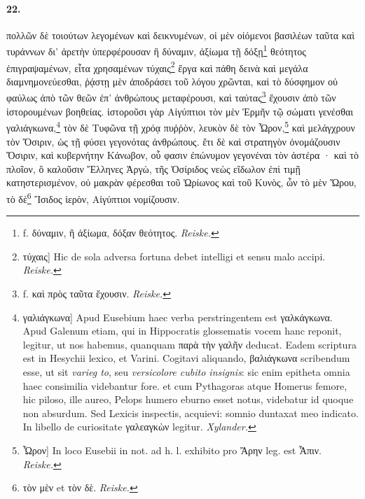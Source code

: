 \documentclass[a4paper, 11pt, oneside, polutonikogreek, german]{article}
\begin{document}
\paragraph{22.}
πολλῶν δὲ τοιούτων λεγομένων καὶ δεικνυμένων, οἱ μὲν οἰόμενοι βασιλέων ταῦτα καὶ τυράννων δι' ἀρετὴν ὑπερφέρουσαν ἢ δύναμιν, ἀξίωμα τῇ δόξῃ\footnote{f. δύναμιν, ἢ ἀξίωμα, δόξαν θεότητος. \emph{Reiske.}} θεότητος ἐπιγραψαμένων, εἶτα χρησαμένων τύχαις\footnote{τύχαις] Hic de sola adversa fortuna debet intelligi et sensu malo accipi. \emph{Reiske.}} ἔργα καὶ πάθη δεινὰ καὶ μεγάλα διαμνημονεύεσθαι, ῥᾴστῃ μὲν ἀποδράσει τοῦ λόγου χρῶνται, καὶ τὸ δύσφημον οὐ φαύλως ἀπὸ τῶν θεῶν ἐπ' ἀνθρώπους μεταφέρουσι, καὶ ταύτας\footnote{f. καὶ πρὸς ταῦτα ἔχουσιν. \emph{Reiske.}} ἔχουσιν ἀπὸ τῶν ἱστορουμένων βοηθείας. ἱστοροῦσι γὰρ Αἰγύπτιοι τὸν μὲν Ἑρμῆν τῷ σώματι γενέσθαι γαλιάγκωνα,\footnote{γαλιάγκωνα] Apud Eusebium haec verba perstringentem est γαλκάγκωνα. Apud Galenum etiam, qui in Hippocratis glossematis vocem hanc reponit, legitur, ut nos habemus, quanquam παρὰ τὴν γαλῆν deducat. Eadem scriptura est in Hesychii lexico, et Varini. Cogitavi aliquando, βαλιάγκωνα scribendum esse, ut sit \emph{varieg to}, seu \emph{versicolore cubito insignis}: sic enim epitheta omnia haec consimilia videbantur fore. et cum Pythagoras atque Homerus femore, hic piloso, ille aureo, Pelops humero eburno esset notus, videbatur id quoque non absurdum. Sed Lexicis inspectis, acquievi: somnio duntaxat meo indicato. In libello de curiositate γαλεαγκὼν legitur. \emph{Xylander.}} τὸν δὲ Τυφῶνα τῇ χρόᾳ πυῤῥὸν, λευκὸν δὲ τὸν Ὦρον,\footnote{Ὦρον] In loco Eusebii in not. ad h. l. exhibito pro Ἄρην leg. est Ἆπιν. \emph{Reiske.}} καὶ μελάγχρουν τὸν Ὄσιριν, ὡς τῇ φύσει γεγονότας ἀνθρώπους. ἔτι δὲ καὶ στρατηγὸν ὀνομάζουσιν Ὄσιριν, καὶ κυβερνήτην Κάνωβον, οὗ φασιν ἐπώνυμον γεγονέναι τὸν ἀστέρα · καὶ τὸ πλοῖον, ὃ καλοῦσιν Ἕλληνες Ἀργὼ, τῆς Ὀσίριδος νεὼς εἴδωλον ἐπὶ τιμῇ κατηστερισμένον, οὐ μακρὰν φέρεσθαι τοῦ Ὠρίωνος καὶ τοῦ Κυνὸς, ὧν τὸ μὲν Ὥρου, τὸ δὲ\footnote{τὸν μὲν et τὸν δὲ. \emph{Reiske.}} Ἴσιδος ἱερὸν, Αἰγύπτιοι νομίζουσιν.
\end{document}
